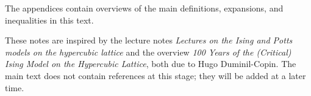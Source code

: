 The appendices contain overviews of the main definitions, expansions, and inequalities in this text.

These notes are inspired by the lecture notes \emph{Lectures on the Ising and Potts
models on the hypercubic lattice}
and the overview \emph{100 Years of the (Critical) Ising Model on the Hypercubic Lattice},
both due to Hugo Duminil-Copin.
The main text does not contain references at this stage; they will be added at a later time.












% 
% 

% 
% 




